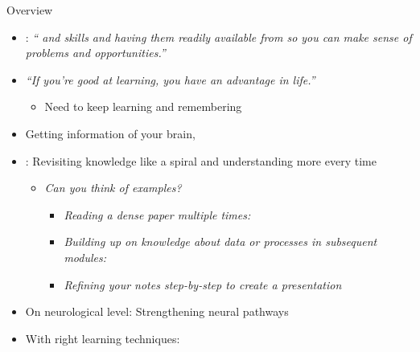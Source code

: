 \documentclass{ercisbeamer}
\begin{document}
\begin{frame}{Overview}
    \begin{tbox}
        \begin{itemize}
            \item {}: \emph{`` and skills and having them readily available from  so you can make sense of  problems and opportunities.'' }
            \item \emph{``If you're good at learning, you have an advantage in life.'' }
            \begin{itemize}
                \item Need to keep learning and remembering 
            \end{itemize}
            \item Getting information  of your brain,  \cite{agarwal19}
            \item {}: Revisiting knowledge like a spiral and understanding more every time
            \begin{itemize}
                \item \emph{Can you think of examples?} \pause
                \begin{itemize}
                    \item \emph{Reading a dense paper multiple times: }
                    \item \emph{Building up on knowledge about \emph{data} or \emph{processes} in subsequent modules: }
                    \item \emph{Refining your notes step-by-step to create a presentation}
                \end{itemize}
            \end{itemize}
            \item On neurological level: Strengthening neural pathways
            \item With right learning techniques: 
        \end{itemize}
    \end{tbox}
\end{frame}
\end{document}

